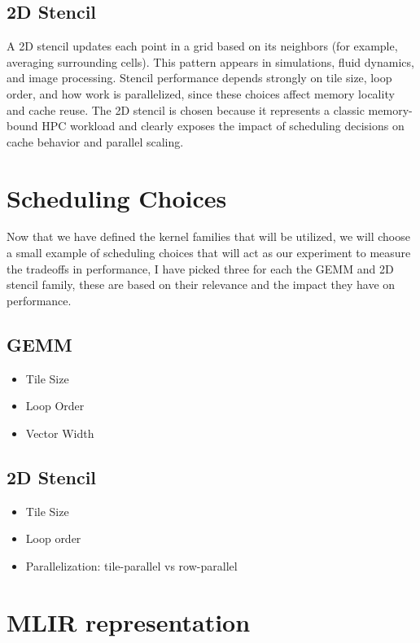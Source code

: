 \subsection*{2D Stencil} 

A 2D stencil updates each point in a grid based on its neighbors (for example, averaging surrounding cells). This pattern appears in simulations, fluid dynamics, and image processing. Stencil performance depends strongly on tile size, loop order, and how work is parallelized, since these choices affect memory locality and cache reuse. The 2D stencil is chosen because it represents a classic memory-bound HPC workload and clearly exposes the impact of scheduling decisions on cache behavior and parallel scaling.

\section*{Scheduling Choices}

Now that we have defined the kernel families that will be utilized, we will choose a small example of scheduling choices that will act as our experiment to measure the tradeoffs in performance, I have picked three for each the GEMM and 2D stencil family, these are based on their relevance and the impact they have on performance.

\subsection*{GEMM}
\begin{itemize}
    \item Tile Size
    \item Loop Order
    \item Vector Width
\end{itemize}

\subsection*{2D Stencil}
\begin{itemize}
    \item Tile Size
    \item Loop order
    \item Parallelization: tile-parallel vs row-parallel
\end{itemize}


\section*{MLIR representation}

